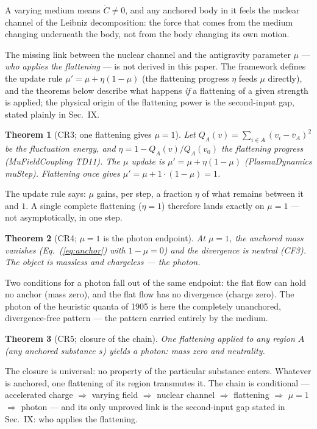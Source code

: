 \documentclass[aps,prd,preprint,superscriptaddress,amsmath,amssymb]{revtex4-2}
\newtheorem{theorem}{Theorem}[section]
\begin{document}
A varying medium means $\dot C\neq 0$, and any anchored body in it
feels the nuclear channel of the Leibniz decomposition: the force that
comes from the medium changing underneath the body, not from the body
changing its own motion.

The missing link between the nuclear channel and the antigravity
parameter $\mu$ --- \emph{who applies the flattening} --- is not
derived in this paper.  The framework defines the update rule
$\mu'=\mu+\eta(1-\mu)$ (the flattening progress $\eta$ feeds $\mu$
directly), and the theorems below describe what happens \emph{if} a
flattening of a given strength is applied; the physical origin of the
flattening power is the second-input gap, stated plainly in
Sec.~IX.

\begin{theorem}[CR3; one flattening gives $\mu=1$]
\label{thm:cr3}
Let $Q_A(v)=\sum_{i\in A}(v_i-\bar v_A)^2$ be the fluctuation energy,
and $\eta=1-Q_A(v)/Q_A(v_0)$ the flattening progress (MuFieldCoupling
TD11).  The $\mu$ update is $\mu'=\mu+\eta(1-\mu)$
(PlasmaDynamics muStep).  Flattening once gives
$\mu'=\mu+1\cdot(1-\mu)=1$.
\end{theorem}

The update rule says: $\mu$ gains, per step, a fraction $\eta$ of what
remains between it and $1$.  A single complete flattening ($\eta=1$)
therefore lands exactly on $\mu=1$ --- not asymptotically, in one step.

\begin{theorem}[CR4; $\mu=1$ is the photon endpoint]
\label{thm:cr4}
At $\mu=1$, the anchored mass vanishes
(Eq.~(\ref{eq:anchor}) with $1-\mu=0$) and the divergence is neutral
(CF3).  The object is massless and chargeless --- the photon.
\end{theorem}

Two conditions for a photon fall out of the same endpoint: the flat
flow can hold no anchor (mass zero), and the flat flow has no
divergence (charge zero).  The photon of the heuristic quanta of 1905
\cite{einstein1905erzeugung} is here the completely unanchored,
divergence-free pattern --- the pattern carried entirely by the medium.

\begin{theorem}[CR5; closure of the chain]
\label{thm:cr5}
One flattening applied to any region $A$ (any anchored substance $s$)
yields a photon: mass zero and neutrality.
\end{theorem}

The closure is universal: no property of the particular substance
enters.  Whatever is anchored, one flattening of its region
transmutes it.  The chain is conditional --- accelerated charge
$\Rightarrow$ varying field $\Rightarrow$ nuclear channel
$\Rightarrow$ flattening $\Rightarrow$ $\mu=1$ $\Rightarrow$ photon ---
and its only unproved link is the second-input gap stated in Sec.~IX:
who applies the flattening.
\end{document}
